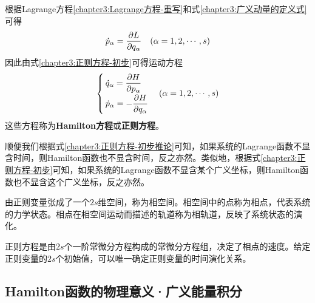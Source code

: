 根据Lagrange方程\eqref{chapter3:Lagrange方程-重写}和式\eqref{chapter3:广义动量的定义式}可得
\begin{equation*}
	\dot{p}_\alpha = \frac{\partial L}{\partial q_\alpha}\quad (\alpha=1,2,\cdots,s)
\end{equation*}
因此由式\eqref{chapter3:正则方程-初步}可得运动方程
\begin{equation}
\begin{cases}
	\dot{q}_\alpha = \dfrac{\partial H}{\partial p_\alpha} \\[1.5ex]
	\dot{p}_\alpha = -\dfrac{\partial H}{\partial q_\alpha} 
\end{cases}
(\alpha = 1,2,\cdots,s)
\label{chapter3:Hamilton正则方程}
\end{equation}
这些方程称为{\bf Hamilton方程}或{\bf 正则方程}。%

顺便我们根据式\eqref{chapter3:正则方程-初步推论}可知，如果系统的Lagrange函数不显含时间，则Hamilton函数也不显含时间，反之亦然。类似地，根据式\eqref{chapter3:正则方程-初步}可知，如果系统的Lagrange函数不显含某个广义坐标，则Hamilton函数也不显含这个广义坐标，反之亦然。

由正则变量张成了一个$2s$维空间，称为{\heiti 相空间}。相空间中的点称为{\heiti 相点}，代表系统的力学状态。相点在相空间运动而描述的轨道称为{\heiti 相轨道}，反映了系统状态的演化。

正则方程是由$2s$个一阶常微分方程构成的常微分方程组，决定了相点的速度。给定正则变量的$2s$个初始值，可以唯一确定正则变量的时间演化关系。




\subsection{Hamilton函数的物理意义·广义能量积分}

